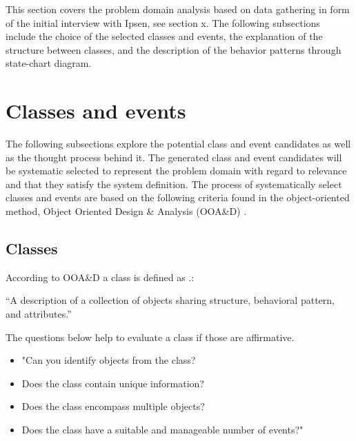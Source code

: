 This section covers the problem domain analysis based on data gathering in form of the initial interview with Ipsen, see section x.
The following subsections include the choice of the selected classes and events, the explanation of the structure between classes, and the description of the behavior patterns through state-chart diagram.

\section{Classes and events}
The following subsections explore the potential class and event candidates as well as the thought process behind it.
The generated class and event candidates will be systematic selected to represent the problem domain with regard to relevance and that they satisfy the system definition.
The process of systematically select classes and events are based on the following criteria found in the object-oriented method, Object Oriented Design \& Analysis (OOA\&D) \cite{Rod-Aalborg} .

\subsection{Classes}
According to OOA\&D a class is defined as \citep[p.~55]{Rod-Aalborg}.:

“A description of a collection of objects sharing structure, behavioral pattern, and attributes.”

The questions below help to evaluate a class if those are affirmative. \citep[p.~62]{Rod-Aalborg}
\begin{itemize}
	\item "Can you identify objects from the class?
	\item Does the class contain unique information?
	\item Does the class encompass multiple objects?
	\item Does the class have a suitable and manageable number of events?"
\end{itemize}

